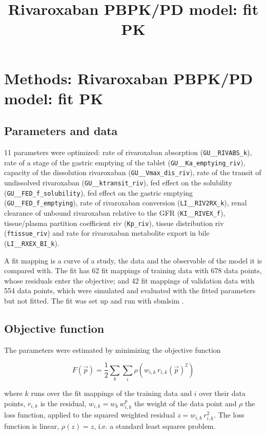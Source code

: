 \documentclass{article}
\title{Rivaroxaban PBPK/PD model: fit PK}
\date{}
\begin{document}
\maketitle

\section{Methods: Rivaroxaban PBPK/PD model: fit PK}

\subsection{Parameters and data}

11 parameters were optimized: rate of rivaroxaban absorption (\texttt{GU\_\_RIVABS\_k}), rate of a stage of the gastric emptying of the tablet (\texttt{GU\_\_Ka\_emptying\_riv}), capacity of the dissolution rivaroxaban (\texttt{GU\_\_Vmax\_dis\_riv}), rate of the transit of undissolved rivaroxaban (\texttt{GU\_\_ktransit\_riv}), fed effect on the solubility (\texttt{GU\_\_FED\_f\_solubility}), fed effect on the gastric emptying (\texttt{GU\_\_FED\_f\_emptying}), rate of rivaroxaban conversion (\texttt{LI\_\_RIV2RX\_k}), renal clearance of unbound rivaroxaban relative to the GFR (\texttt{KI\_\_RIVEX\_f}), tissue/plasma partition coefficient riv (\texttt{Kp\_riv}), tissue distribution riv (\texttt{ftissue\_riv}) and rate for rivaroxaban metabolite export in bile (\texttt{LI\_\_RXEX\_BI\_k}).

A fit mapping is a curve of a study, the data and the observable of the model it is compared with. The fit has 62 fit mappings of training data with 678 data points, whose residuals enter the objective; and 42 fit mappings of validation data with 554 data points, which were simulated and evaluated with the fitted parameters but not fitted. The fit was set up and run with sbmlsim \cite{Koenig2026_sbmlsim}.

\subsection{Objective function}

The parameters were estimated by minimizing the objective function

\begin{equation}
F(\vec{p}) = \frac{1}{2} \sum_{k} \sum_{i} \rho\left(w_{i,k}\, r_{i,k}(\vec{p})^2\right)
\end{equation}

where $k$ runs over the fit mappings of the training data and $i$ over their data points, $r_{i,k}$ is the residual, $w_{i,k} = w_k\, w^{p}_{i,k}$ the weight of the data point and $\rho$ the loss function, applied to the squared weighted residual $z = w_{i,k}\, r_{i,k}^2$. The loss function is linear, $\rho(z) = z$, i.e. a standard least squares problem.
\end{document}
